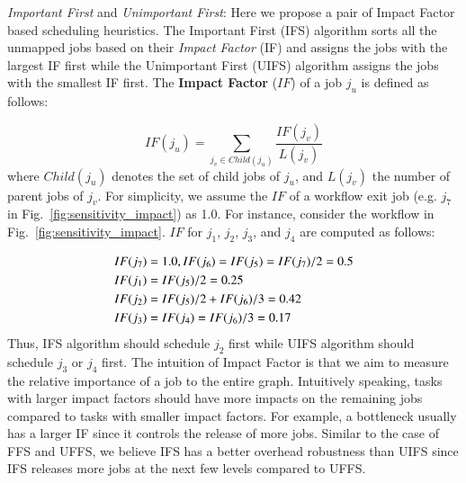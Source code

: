\emph{Important First} and \emph{Unimportant First}: Here we propose a pair of Impact Factor based scheduling heuristics. The Important First (IFS) algorithm sorts all the unmapped jobs based on their \emph{Impact Factor} (IF) and assigns the jobs with the largest IF first while the Unimportant First (UIFS) algorithm assigns the jobs with the smallest IF first. 
The \textbf{Impact Factor} ($IF$) of a job $j_u$ is defined as follows:

\begin{equation}
	IF(j_u)=\sum_{j_v\in Child(j_u)}^{}\frac{IF(j_v)}{L(j_v)}
\end{equation}
where $Child(j_u)$ denotes the set of child jobs of $j_u$, and $L(j_v)$ the number of parent jobs of $j_v$. For simplicity, we assume the $IF$ of a workflow exit job (e.g. $j_7$ in Fig.~\ref{fig:sensitivity_impact}) as 1.0. For instance, consider the workflow in Fig.~\ref{fig:sensitivity_impact}. $IF$ for $j_1$, $j_2$, $j_3$, and $j_4$ are computed as follows:

\begin{eqnarray}
	\displaystyle  
	&IF(j_7 )=1.0, IF(j_6 )=IF(j_5 )=IF(j_7 )/2=0.5\nonumber  \\
	&IF(j_1 )=IF(j_5)/2=0.25\nonumber \\
	&IF(j_2 )=IF(j_5 )/2+IF(j_6)/3=0.42\nonumber \\
	&IF(j_3 )=IF(j_4 )=IF(j_6 )/3=0.17\nonumber 
\end{eqnarray}
Thus, IFS algorithm should schedule $j_2$ first while UIFS algorithm should schedule $j_3$ or $j_4$ first. The intuition of Impact Factor is that we aim to measure the relative importance of a job to the entire graph. Intuitively speaking, tasks with larger impact factors should have more impacts on the remaining jobs compared to tasks with smaller impact factors. For example, a bottleneck usually has a larger IF since it controls the release of more jobs. 
Similar to the case of FFS and UFFS, we believe IFS has a better overhead robustness than UIFS since IFS releases more jobs at the next few levels compared to UFFS. 


